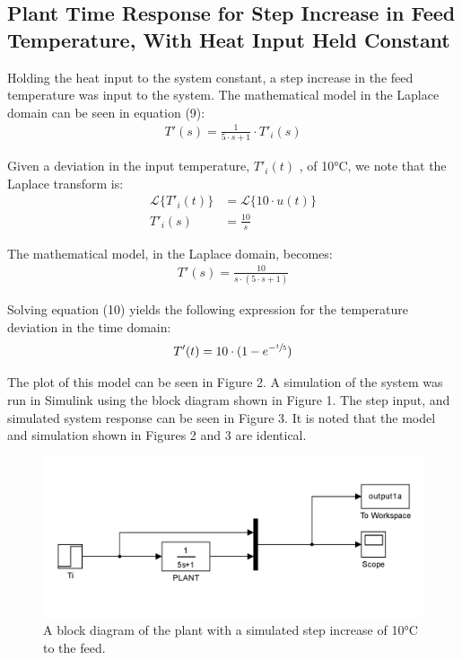 \documentclass{article}
\begin{document}
\subsection{Plant Time Response for Step Increase in Feed Temperature, With Heat Input Held Constant}
Holding the heat input to the system constant, a step increase in the feed temperature was input to the system. The mathematical model in the Laplace domain can be seen in equation (9):
\begin{align}
T'(s) = \frac{1}{5 \cdot s + 1} \cdot T'_i(s)
\end{align} 

Given a deviation in the input temperature, $T'_i(t)$ , of 10$\si{\degreeCelsius}$, we note that the Laplace transform is:
\begin{align*}
\mathscr{L}\{T'_i(t)\} &= \mathscr{L}\{10 \cdot u(t)\}\\
T'_i(s) &= \frac{10}{s}
\end{align*}

The mathematical model, in the Laplace domain, becomes:
\begin{align}
T'(s) = \frac{10}{s \cdot (5 \cdot s + 1)}
\end{align}

Solving equation (10) yields the following expression for the temperature deviation in the time domain:
\begin{align}
T'(t) = 10 \cdot (1 - e^{-\sfrac{t}{5}})
\end{align}

The plot of this model can be seen in Figure 2. A simulation of the system was run in Simulink using the block diagram shown in Figure 1. The step input, and simulated system response can be seen in Figure 3. It is noted that the model and simulation shown in Figures 2 and 3 are identical.

\begin{figure}[h]
\centering
\includegraphics[scale=0.15]{block_1a}
\caption{A block diagram of the plant with a simulated step increase of 10$\si{\degreeCelsius}$ to the feed.}
\end{figure}
\end{document}
